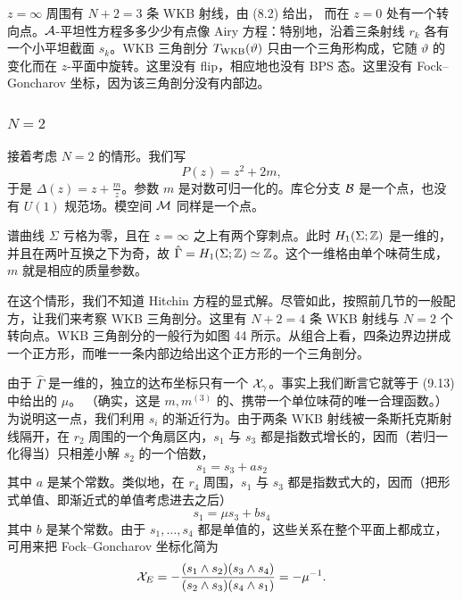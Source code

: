 $z=\infty$ 周围有 $N + 2 = 3$ 条 WKB 射线，由 (8.2) 给出，%
而在 $z=0$ 处有一个转向点。$\mathcal{A}$-平坦性方程多多少少有点像 Airy 方程：特别地，沿着三条射线 $r_k$ 各有一个小平坦截面 $s_k$。WKB 三角剖分 $T_{\rm WKB}(\vartheta)$ 只由一个三角形构成，它随 $\vartheta$ 的变化而在 $z$-平面中旋转。这里没有 flip，相应地也没有 BPS 态。这里没有 Fock–Goncharov 坐标，因为该三角剖分没有内部边。


\subsubsection{$N=2$}

接着考虑 $N=2$ 的情形。我们写
\begin{equation}
P(z) = z^2 + 2m, \label{eq:N2-P}
\end{equation}
于是 $\Delta(z) = z + \frac{m}{z}$。参数 $m$ 是对数可归一化的。库仑分支 $\mathcal{B}$ 是一个点，也没有 $U(1)$ 规范场。模空间 $\mathcal{M}$ 同样是一个点。

谱曲线 $\Sigma$ 亏格为零，且在 $z = \infty$ 之上有两个穿刺点。此时 $H_1(\Sigma; \mathbb{Z})$ 是一维的，并且在两叶互换之下为奇，故 $\hat \Gamma = H_1(\Sigma; \mathbb{Z}) \simeq \mathbb{Z}$。这个一维格由单个味荷生成，$m$ 就是相应的质量参数。

在这个情形，我们不知道 Hitchin 方程的显式解。尽管如此，按照前几节的一般配方，让我们来考察 WKB 三角剖分。这里有 $N + 2 = 4$ 条 WKB 射线与 $N = 2$ 个转向点。WKB 三角剖分的一般行为如图 44 所示。从组合上看，四条边界边拼成一个正方形，而唯一一条内部边给出这个正方形的一个三角剖分。

由于 $\hat\Gamma$ 是一维的，独立的达布坐标只有一个 $\mathcal{X}_{\gamma}$。事实上我们断言它就等于 (9.13) 中给出的 $\mu$。%
（确实，这是 $m, m^{(3)}$ 的、携带一个单位味荷的唯一合理函数。）为说明这一点，我们利用 $s_i$ 的渐近行为。由于两条 WKB 射线被一条斯托克斯射线隔开，在 $r_2$ 周围的一个角扇区内，$s_1$ 与 $s_3$ 都是指数式增长的，因而（若归一化得当）只相差小解 $s_2$ 的一个倍数，
\begin{equation}
s_1 = s_3 + a s_2 \label{eq:s1s3a}
\end{equation}
其中 $a$ 是某个常数。类似地，在 $r_4$ 周围，$s_1$ 与 $s_3$ 都是指数式大的，因而（把形式单值、即渐近式的单值考虑进去之后）
\begin{equation}
s_1 = \mu s_3 + b s_4 \label{eq:s1mus3}
\end{equation}
其中 $b$ 是某个常数。由于 $s_1, \dots, s_4$ 都是单值的，这些关系在整个平面上都成立，可用来把 Fock–Goncharov 坐标化简为
\begin{equation}
\mathcal{X}_E =  -\frac{(s_1 \wedge s_2) (s_3 \wedge s_4)}{(s_2 \wedge s_3) (s_4
\wedge s_1)} = -\mu^{-1}. \label{eq:XE-N2}
\end{equation}

